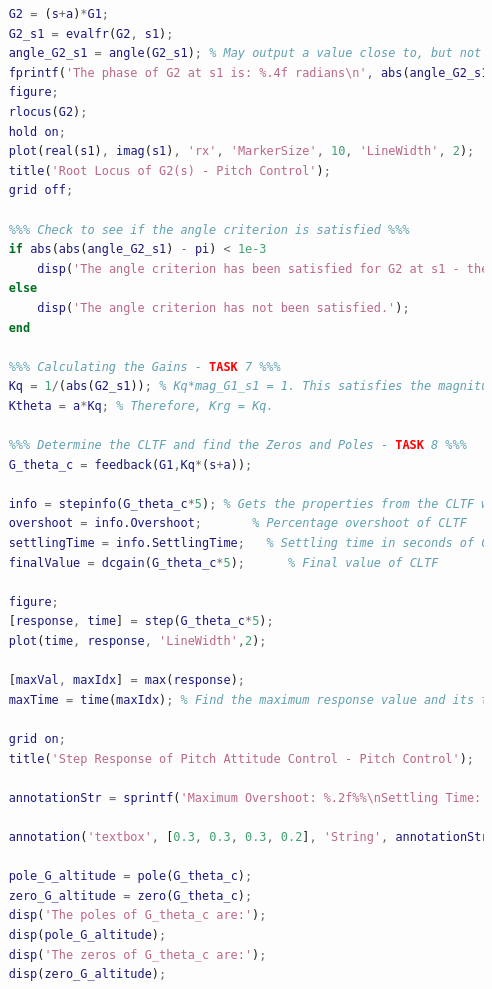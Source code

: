 \documentclass[stu, a4paper, 12pt, floatsintext]{apa7}
\numberwithin{figure}{section}
\numberwithin{table}{section}
\numberwithin{equation}{section}
\begin{document}
\begin{lstlisting}[language=MATLAB]
    %%% Define G2 and show the point s1 on it's Root Locus Plot - TASK 6 %%%
    G2 = (s+a)*G1;
    G2_s1 = evalfr(G2, s1);
    angle_G2_s1 = angle(G2_s1); % May output a value close to, but not exactly pi - the criterion should still be met.
    fprintf('The phase of G2 at s1 is: %.4f radians\n', abs(angle_G2_s1));
    figure;
    rlocus(G2);
    hold on;
    plot(real(s1), imag(s1), 'rx', 'MarkerSize', 10, 'LineWidth', 2);
    title('Root Locus of G2(s) - Pitch Control');
    grid off;
    
    %%% Check to see if the angle criterion is satisfied %%%
    if abs(abs(angle_G2_s1) - pi) < 1e-3
        disp('The angle criterion has been satisfied for G2 at s1 - the phase is approximately pi.');
    else
        disp('The angle criterion has not been satisfied.');
    end
    
    %%% Calculating the Gains - TASK 7 %%%
    Kq = 1/(abs(G2_s1)); % Kq*mag_G1_s1 = 1. This satisfies the magnitude condition at s1. This means the CL pole will be at s1. 
    Ktheta = a*Kq; % Therefore, Krg = Kq.
    
    %%% Determine the CLTF and find the Zeros and Poles - TASK 8 %%%
    G_theta_c = feedback(G1,Kq*(s+a));
    
    info = stepinfo(G_theta_c*5); % Gets the properties from the CLTF with a step change of 5 degrees.
    overshoot = info.Overshoot;       % Percentage overshoot of CLTF
    settlingTime = info.SettlingTime;   % Settling time in seconds of CLTF
    finalValue = dcgain(G_theta_c*5);      % Final value of CLTF
    
    figure;
    [response, time] = step(G_theta_c*5);
    plot(time, response, 'LineWidth',2);
    
    [maxVal, maxIdx] = max(response); 
    maxTime = time(maxIdx); % Find the maximum response value and its time
    
    grid on;
    title('Step Response of Pitch Attitude Control - Pitch Control');
    
    annotationStr = sprintf('Maximum Overshoot: %.2f%%\nSettling Time: %.2f s\nFinal Value: %.2f', overshoot, settlingTime, finalValue); % Creates the annotation text with variable placeholders.
    
    annotation('textbox', [0.3, 0.3, 0.3, 0.2], 'String', annotationStr, 'FitBoxToText', 'on', 'BackgroundColor', '#ADD8E6', 'EdgeColor', 'black', 'FontSize', 50); % Creates the annotation with a text box.
    
    pole_G_altitude = pole(G_theta_c);
    zero_G_altitude = zero(G_theta_c);
    disp('The poles of G_theta_c are:');
    disp(pole_G_altitude);
    disp('The zeros of G_theta_c are:');
    disp(zero_G_altitude);
    

\end{lstlisting}
\end{document}
